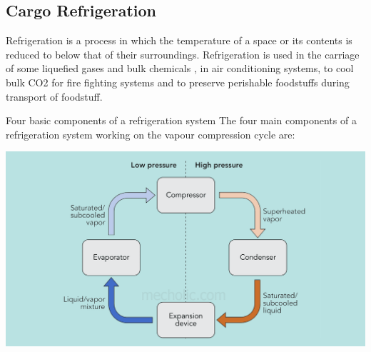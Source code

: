 \documentclass[11pt,a4paper]{article}
\begin{document}
\subsection{Cargo Refrigeration}
Refrigeration is a process in which the temperature of a space or its contents is reduced to below that of their surroundings. Refrigeration is used in the carriage of some liquefied gases and bulk chemicals , in air conditioning systems, to cool bulk CO2 for fire fighting systems and to preserve perishable foodstuffs during transport of foodstuff.

Four basic components of a refrigeration system The four main components of a refrigeration system working on the vapour compression cycle are:

\begin{center}
\includegraphics[width=\textwidth]{refrigeration.png}
\end{center}
\end{document}
